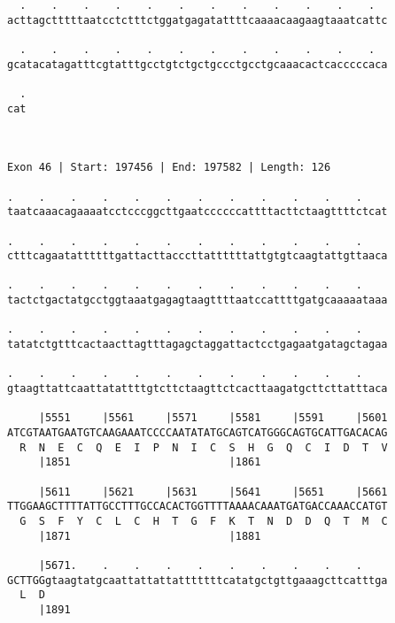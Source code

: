 \documentclass{article}
\begin{document}
\begin{Verbatim}
  .    .    .    .    .    .    .    .    .    .    .    .  
acttagctttttaatcctctttctggatgagatattttcaaaacaagaagtaaatcattc
                                                            
  .    .    .    .    .    .    .    .    .    .    .    .  
gcatacatagatttcgtatttgcctgtctgctgccctgcctgcaaacactcacccccaca
                                                            
  .
cat
   
   
 
Exon 46 | Start: 197456 | End: 197582 | Length: 126
 
.    .    .    .    .    .    .    .    .    .    .    .    
taatcaaacagaaaatcctcccggcttgaatccccccattttacttctaagttttctcat
                                                            
.    .    .    .    .    .    .    .    .    .    .    .    
ctttcagaatattttttgattacttacccttattttttattgtgtcaagtattgttaaca
                                                            
.    .    .    .    .    .    .    .    .    .    .    .    
tactctgactatgcctggtaaatgagagtaagttttaatccattttgatgcaaaaataaa
                                                            
.    .    .    .    .    .    .    .    .    .    .    .    
tatatctgtttcactaacttagtttagagctaggattactcctgagaatgatagctagaa
                                                            
.    .    .    .    .    .    .    .    .    .    .    .    
gtaagttattcaattatattttgtcttctaagttctcacttaagatgcttcttatttaca
                                                            
     |5551     |5561     |5571     |5581     |5591     |5601
ATCGTAATGAATGTCAAGAAATCCCCAATATATGCAGTCATGGGCAGTGCATTGACACAG
  R  N  E  C  Q  E  I  P  N  I  C  S  H  G  Q  C  I  D  T  V
     |1851                         |1861                    
  
     |5611     |5621     |5631     |5641     |5651     |5661
TTGGAAGCTTTTATTGCCTTTGCCACACTGGTTTTAAAACAAATGATGACCAAACCATGT
  G  S  F  Y  C  L  C  H  T  G  F  K  T  N  D  D  Q  T  M  C
     |1871                         |1881                    
  
     |5671.    .    .    .    .    .    .    .    .    .    
GCTTGGgtaagtatgcaattattattatttttttcatatgctgttgaaagcttcatttga
  L  D                                                      
     |1891                                                  
  

\end{Verbatim}
\end{document}
